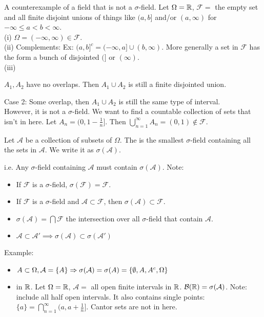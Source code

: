 \documentclass[class=article, crop=false]{standalone}
\begin{document}
A counterexample of a field that is not a $\sigma$-field.
Let $\Omega = \mathbb{R}$, $\mathcal{F}=$ the empty set and all finite disjoint unions of things like $(a,b]$ and/or  $(a,\infty)$ for $-\infty\leq a<b<\infty$.\\
(i) $\Omega=(-\infty,\infty) \in \mathcal{F}$.\\
(ii) Complements: Ex: $(a,b]^{c} =(-\infty,a] \cup (b,\infty)$. More generally a set in $\mathcal{F}$ has the form a bunch of disjointed $(]$ or $(\infty)$. \\
(iii)\\ 
\begin{case}[1]
$A_1,A_2$ have no overlaps. Then $A_1 \cup A_2$ is still a finite disjointed union.
\end{case}
Case 2: Some overlap, then $A_1 \cup A_2$ is still the same type of interval.\\
However, it is not a $\sigma$-field. We want to find a countable collection of sets that isn't in here. Let $A_n=(0,1-\frac{1}{n}]$. Then $\bigcup_{n= 1}^{ \infty} A_n =(0,1) \not \in \mathcal{F} $.
\begin{defn}
	Let $\mathcal{A}$ be a collection of subsets of $\Omega$. The  is the smallest $\sigma$-field containing all the sets in $\mathcal{A}$. We write it as $\sigma(\mathcal{A})$.
\end{defn}
i.e. Any $\sigma$-field containing $\mathcal{A}$  must contain $\sigma(\mathcal{A})$.
Note: 
\begin{itemize}
	\item If $\mathcal{F}$ is a $\sigma$-field, $\sigma(\mathcal{F})=\mathcal{F}$.
	\item If $\mathcal{F}$ is a $\sigma$-field and $\mathcal{A}\subset \mathcal{F}$, then $\sigma(\mathcal{A}) \subset \mathcal{F}$.
	\item $\sigma(\mathcal{A}) = \bigcap \mathcal{F}$ the intersection over all $\sigma$-field that contain $\mathcal{A}$.
	\item $\mathcal{A}\subset \mathcal{A}' \implies  \sigma(\mathcal{A}) \subset \sigma(\mathcal{A}')$ 
\end{itemize}

Example:
\begin{itemize}
	\item $A \subset \Omega, \mathcal{A}=\{A\} \Rightarrow \sigma(\mathcal{A})=\sigma(A)=\{\emptyset,A,A^{c},\Omega\}$
	\item {} in $\mathbb{R}$. Let $\Omega=\mathbb{R}$, $\mathcal{A}=$ all open finite intervals in $\mathbb{R}$. $\mathcal{B}(\mathbb{R})=\sigma(\mathcal{A})$. Note: include all half open intervals. It also contains single points: $\{a\}=\bigcap_{n= 1}^{ \infty} (a,a+\frac{1}{n}]$. Cantor sets are not in here. 
\end{itemize}
\end{document}
